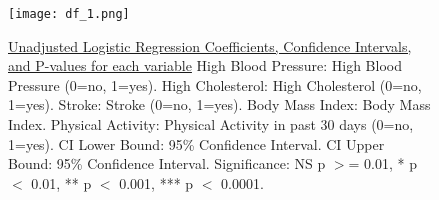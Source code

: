 \documentclass[11pt]{article}
\begin{document}

\begin{figure}[htbp]
\centering
\texttt{[image: df\_1.png]}
\caption{\protect\hyperlink{file-df-1-pkl}{Unadjusted Logistic Regression Coefficients, Confidence Intervals, and P-values for each variable}
High Blood Pressure: High Blood Pressure (0=no, 1=yes). 
High Cholesterol: High Cholesterol (0=no, 1=yes). 
Stroke: Stroke (0=no, 1=yes). 
Body Mass Index: Body Mass Index. 
Physical Activity: Physical Activity in past 30 days (0=no, 1=yes). 
CI Lower Bound: 95\% Confidence Interval. 
CI Upper Bound: 95\% Confidence Interval. 
Significance: NS p $>$= 0.01, * p $<$ 0.01, ** p $<$ 0.001, *** p $<$ 0.0001. }
\label{figure:Unadjusted_Coefficients}
\end{figure}
% 
% 
% 
% 
% 
% 
% 
\end{document}
